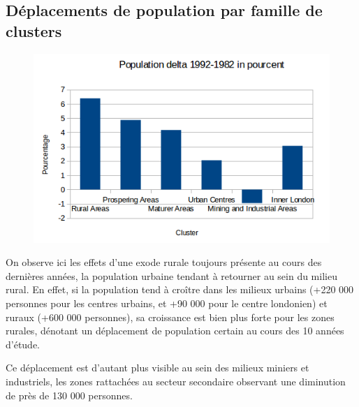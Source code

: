 \pagebreak


\subsection{Déplacements de population par famille de clusters}

\begin{figure}[h!]
    \centering
    \includegraphics[width=\linewidth]{images/pop/deltaPopFamilleCluster.png}
\end{figure}

On observe ici les effets d'une exode rurale toujours présente au cours des dernières années, la population urbaine tendant à retourner au sein du milieu rural. En effet, si la population tend à croître dans les milieux urbains (+220 000 personnes pour les centres urbains, et +90 000 pour le centre londonien) et ruraux (+600 000 personnes), sa croissance est bien plus forte pour les zones rurales, dénotant un déplacement de population certain au cours des 10 années d'étude.

Ce déplacement est d'autant plus visible au sein des milieux miniers et industriels, les zones rattachées au secteur secondaire observant une diminution de près de 130 000 personnes.
\pagebreak
